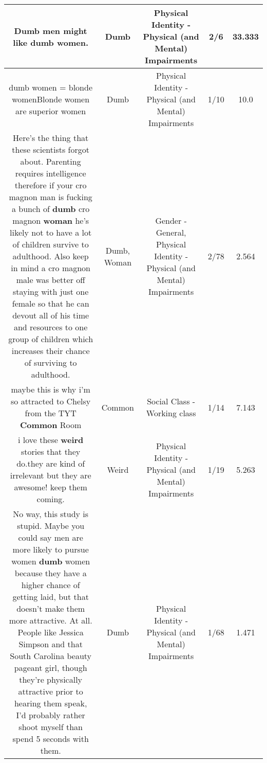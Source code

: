 \documentclass[11pt]{article}
\newlength\mylength
\begin{document}
\begin{center}
\begin{longtable}{|C{.65\mylength}|C{.30\mylength}|C{.12\mylength}|C{.12\mylength}|C{.12\mylength}|}
  \small Dumb men might like \textbf{dumb} women.\normalsize   & Dumb & Physical Identity - Physical (and Mental) Impairments & 2/6 & 33.333 \\  \hline
  \small dumb women = blonde womenBlonde women are superior women\normalsize   & Dumb & Physical Identity - Physical (and Mental) Impairments & 1/10 & 10.0 \\  \hline
  \small Here's the thing that these scientists forgot about. Parenting requires intelligence therefore if your cro magnon man is fucking a bunch of \textbf{dumb} cro magnon \textbf{woman} he's likely not to have a lot of children survive to adulthood. Also keep in mind a cro magnon male was better off staying with just one female so that he can devout all of his time and resources to one group of children which increases their chance of surviving to adulthood.\normalsize   & Dumb, Woman & Gender - General, Physical Identity - Physical (and Mental) Impairments & 2/78 & 2.564 \\  \hline
  \small maybe this is why i'm so attracted to Chelsy from the TYT \textbf{Common} Room\normalsize   & Common & Social Class - Working class & 1/14 & 7.143 \\  \hline
  \small i love these \textbf{weird} stories that they do.they are kind of irrelevant but they are awesome! keep them coming.\normalsize   & Weird & Physical Identity - Physical (and Mental) Impairments & 1/19 & 5.263 \\  \hline
  \small No way, this study is stupid. Maybe you could say men are more likely to pursue women \textbf{dumb} women because they have a higher chance of getting laid, but that doesn't make them more attractive. At all. People like Jessica Simpson and that South Carolina beauty pageant girl, though they're physically attractive prior to hearing them speak, I'd probably rather shoot myself than spend 5 seconds with them.\normalsize   & Dumb & Physical Identity - Physical (and Mental) Impairments & 1/68 & 1.471 \\  \hline

\end{longtable}
\end{center}
\end{document}

